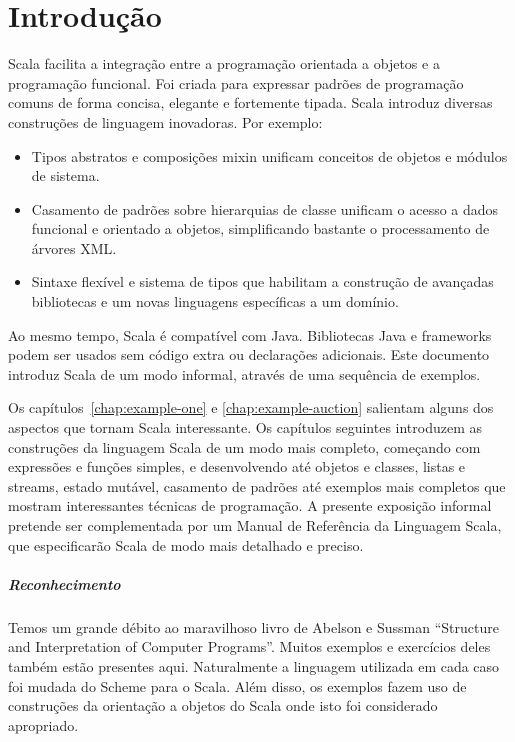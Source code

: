 \documentclass[a4paper,12pt,twoside,titlepage]{book}
\begin{document}
\frontmatter
\makedoctitle
\clearemptydoublepage
\tableofcontents
\mainmatter
\sloppy

\chapter{\label{chap:intro}Introdu\c{c}\~{a}o}

Scala facilita a integra\c{c}\~{a}o entre a  programa\c{c}\~{a}o orientada a objetos e a programa\c{c}\~{a}o funcional.
Foi criada para expressar padr\~{o}es de programa\c{c}\~{a}o comuns de forma concisa, elegante e fortemente tipada. 
Scala introduz diversas constru\c{c}\~{o}es de linguagem inovadoras. Por exemplo:

\begin{itemize}
\item
Tipos abstratos e composi\c{c}\~{o}es mixin unificam conceitos de objetos e m\'{o}dulos de sistema.
\item
Casamento de padr\~{o}es sobre hierarquias de classe unificam o acesso a dados funcional e orientado a 
objetos, simplificando bastante o processamento de \'{a}rvores XML.
\item
Sintaxe flex\'{i}vel e sistema de tipos que habilitam a constru\c{c}\~{a}o de avan\c{c}adas 
bibliotecas e um novas linguagens espec\'{i}ficas a um dom\'{i}nio.
\end{itemize}

Ao mesmo tempo, Scala \'{e} compat\'{i}vel com Java. Bibliotecas Java e frameworks
podem ser usados sem c\'{o}digo extra ou declara\c{c}\~{o}es adicionais.
Este documento introduz Scala de um modo informal, atrav\'{e}s de uma sequ\^{e}ncia
de exemplos.

Os cap\'{i}tulos~\ref{chap:example-one} e \ref{chap:example-auction}
salientam alguns dos aspectos que tornam Scala interessante. Os
cap\'{i}tulos seguintes introduzem as constru\c{c}\~{o}es da linguagem Scala de um
modo mais completo, come\c{c}ando com express\~{o}es e fun\c{c}\~{o}es simples, e 
desenvolvendo at\'{e} objetos e classes, listas e streams, estado 
mut\'{a}vel, casamento de padr\~{o}es at\'{e} exemplos mais completos que mostram
interessantes t\'{e}cnicas de programa\c{c}\~{a}o. A presente exposi\c{c}\~{a}o informal
pretende ser complementada por um Manual de Refer\^{e}ncia da Linguagem Scala, que
especificar\~{a}o Scala de modo mais detalhado e preciso. 

\paragraph{Reconhecimento}

Temos um grande d\'{e}bito ao maravilhoso livro de Abelson e Sussman
``Structure and Interpretation of Computer
Programs''\cite{abelson-sussman:structure}. Muitos exemplos e exerc\'{i}cios 
deles tamb\'{e}m est\~{a}o presentes aqui. Naturalmente a linguagem utilizada em
cada caso foi mudada do Scheme para o Scala. Al\'{e}m disso, os exemplos
fazem uso de constru\c{c}\~{o}es da orienta\c{c}\~{a}o a objetos do Scala onde isto foi
considerado apropriado. 




\end{document}
